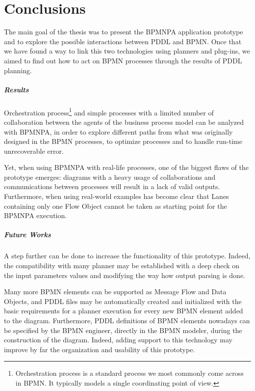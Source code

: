 \chapter*{Conclusions} %
\label{Conclusions}



The main goal of the thesis was to present the BPMNPA application prototype and to explore the possible interactions between PDDL and BPMN. Once that we have found a way to link this two technologies using planners and plug-ins, we aimed to find out how to act on BPMN processes through the results of PDDL planning. 

\paragraph{Results}
Orchestration process\footnote{Orchestration process is a standard process we most commonly come across in BPMN. It typically models a single coordinating point of view.} and simple processes with a limited number of collaboration between the agents of the business process model can be analyzed with BPMNPA, in order to explore different paths from what was originally designed in the BPMN processes, to optimize processes and to handle run-time unrecoverable error. 

Yet, when using BPMNPA with real-life processes, one of the biggest flaws of the prototype emerges: diagrams with a heavy usage of collaborations and communications between processes will result in a lack of valid outputs.
Furthermore, when using real-world examples has become clear that Lanes containing only one Flow Object cannot be taken as starting point for the BPMNPA execution.

\paragraph{Future Works}
A step further can be done to increase the functionality of this prototype. Indeed, the compatibility with many planner may be established with a deep check on the input parameters values and modifying the way how output parsing is done.

Many more BPMN elements can be supported as Message Flow and Data Objects, and 
PDDL files may be automatically created and initialized with the basic requirements for a planner execution for every new BPMN element added to the diagram. 
Furthermore, PDDL definitions of BPMN elements nowadays can be specified by the BPMN engineer, directly in the BPMN modeler, during the construction of the diagram. Indeed, adding support to this technology may improve by far the organization and usability of this prototype.


